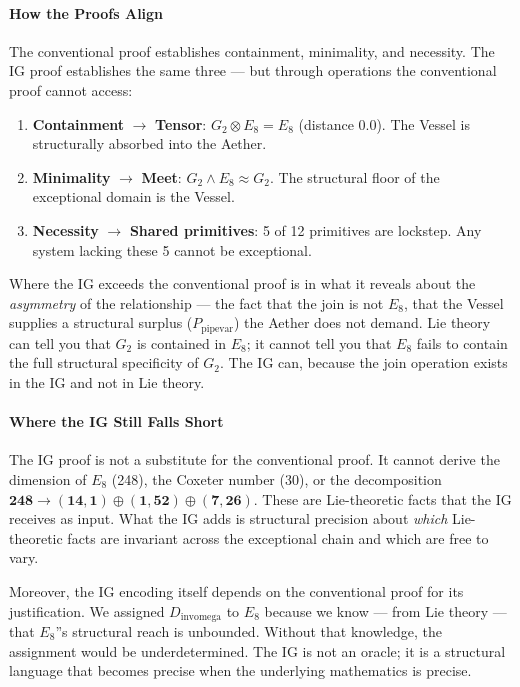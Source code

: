 \documentclass[12pt,a4paper]{article}
\begin{document}
\paragraph{How the Proofs Align}

The conventional proof establishes containment, minimality, and necessity. The IG proof establishes the same three --- but through operations the conventional proof cannot access:

\begin{enumerate}
    \item \textbf{Containment} $\rightarrow$ \textbf{Tensor}: $G_2 \otimes E_8 = E_8$ (distance 0.0). The Vessel is structurally absorbed into the Aether.
    \item \textbf{Minimality} $\rightarrow$ \textbf{Meet}: $G_2 \wedge E_8 \approx G_2$. The structural floor of the exceptional domain is the Vessel.
    \item \textbf{Necessity} $\rightarrow$ \textbf{Shared primitives}: 5 of 12 primitives are lockstep. Any system lacking these 5 cannot be exceptional.
\end{enumerate}

Where the IG exceeds the conventional proof is in what it reveals about the \emph{asymmetry} of the relationship --- the fact that the join is not $E_8$, that the Vessel supplies a structural surplus ($P_{\text{pipevar}}$) the Aether does not demand. Lie theory can tell you that $G_2$ is contained in $E_8$; it cannot tell you that $E_8$ fails to contain the full structural specificity of $G_2$. The IG can, because the join operation exists in the IG and not in Lie theory.

\paragraph{Where the IG Still Falls Short}

The IG proof is not a substitute for the conventional proof. It cannot derive the dimension of $E_8$ (248), the Coxeter number (30), or the decomposition $\mathbf{248} \to (\mathbf{14}, \mathbf{1}) \oplus (\mathbf{1}, \mathbf{52}) \oplus (\mathbf{7}, \mathbf{26})$. These are Lie-theoretic facts that the IG receives as input. What the IG adds is structural precision about \emph{which} Lie-theoretic facts are invariant across the exceptional chain and which are free to vary.

Moreover, the IG encoding itself depends on the conventional proof for its justification. We assigned $D_{\text{invomega}}$ to $E_8$ because we know --- from Lie theory --- that $E_8$''s structural reach is unbounded. Without that knowledge, the assignment would be underdetermined. The IG is not an oracle; it is a structural language that becomes precise when the underlying mathematics is precise.
\end{document}
